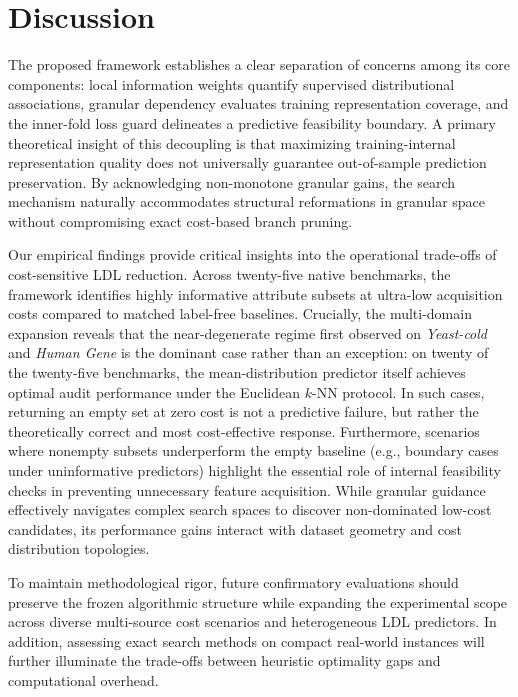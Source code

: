 \section{Discussion}
\label{sec:discussion}

The proposed framework establishes a clear separation of concerns among its core components: local information weights quantify supervised distributional associations, granular dependency evaluates training representation coverage, and the inner-fold loss guard delineates a predictive feasibility boundary. A primary theoretical insight of this decoupling is that maximizing training-internal representation quality does not universally guarantee out-of-sample prediction preservation. By acknowledging non-monotone granular gains, the search mechanism naturally accommodates structural reformations in granular space without compromising exact cost-based branch pruning.

Our empirical findings provide critical insights into the operational trade-offs of cost-sensitive LDL reduction. Across twenty-five native benchmarks, the framework identifies highly informative attribute subsets at ultra-low acquisition costs compared to matched label-free baselines. Crucially, the multi-domain expansion reveals that the near-degenerate regime first observed on \emph{Yeast-cold} and \emph{Human Gene} is the dominant case rather than an exception: on twenty of the twenty-five benchmarks, the mean-distribution predictor itself achieves optimal audit performance under the Euclidean $k$-NN protocol. In such cases, returning an empty set at zero cost is not a predictive failure, but rather the theoretically correct and most cost-effective response. Furthermore, scenarios where nonempty subsets underperform the empty baseline (e.g., boundary cases under uninformative predictors) highlight the essential role of internal feasibility checks in preventing unnecessary feature acquisition. While granular guidance effectively navigates complex search spaces to discover non-dominated low-cost candidates, its performance gains interact with dataset geometry and cost distribution topologies.

To maintain methodological rigor, future confirmatory evaluations should preserve the frozen algorithmic structure while expanding the experimental scope across diverse multi-source cost scenarios and heterogeneous LDL predictors. In addition, assessing exact search methods on compact real-world instances will further illuminate the trade-offs between heuristic optimality gaps and computational overhead.


